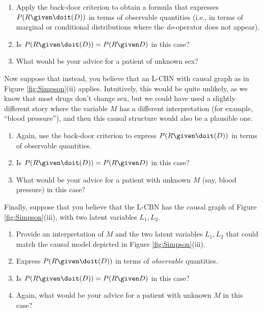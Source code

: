 \begin{enumerate}[label=8.\arabic*]
    \begin{enumerate}[resume*]
        \item \label{Simpson_1} Apply the back-door criterion to obtain a formula that expresses $P(R \given \doit(D))$ in terms of observable quantities (i.e., in terms of marginal or conditional distributions where the \emph{do}-operator does not appear).
        \item Is $P(R \given \doit(D)) = P(R \given D)$ in this case?
        \item What would be your advice for a patient of unknown sex?
    \end{enumerate}

    Now suppose that instead, you believe that an L-CBN with causal graph as in Figure \ref{fig:Simpson}(ii) applies. Intuitively, this would be quite unlikely, as we
    know that most drugs don't change sex, but we could have used a slightly different story where the variable $M$ has a different interpretation
    (for example, ``blood pressure''), and then this causal structure would also be a plausible one.

    \begin{enumerate}[resume*]
        \item Again, use the back-door criterion to express $P(R \given \doit(D))$ in terms of observable quantities.
        \item Is $P(R \given \doit(D)) = P(R \given D)$ in this case?
        \item \label{Simpson_2} What would be your advice for a patient with unknown $M$ (say, blood pressure) in this case?
    \end{enumerate}

    Finally, suppose that you believe that the L-CBN has the causal graph of Figure \ref{fig:Simpson}(iii), with two
    latent variables $L_1,L_2$.

    \begin{enumerate}[resume*]
        \item Provide an interpretation of $M$ and the two latent variables $L_1,L_2$ that could match the causal model depicted in Figure \ref{fig:Simpson}(iii).
        \item Express $P(R \given \doit(D))$ in terms of \emph{observable} quantities.
        \item Is $P(R \given \doit(D)) = P(R \given D)$ in this case?
        \item Again, what would be your advice for a patient with unknown $M$ in this case?
    \end{enumerate}


\end{enumerate}
